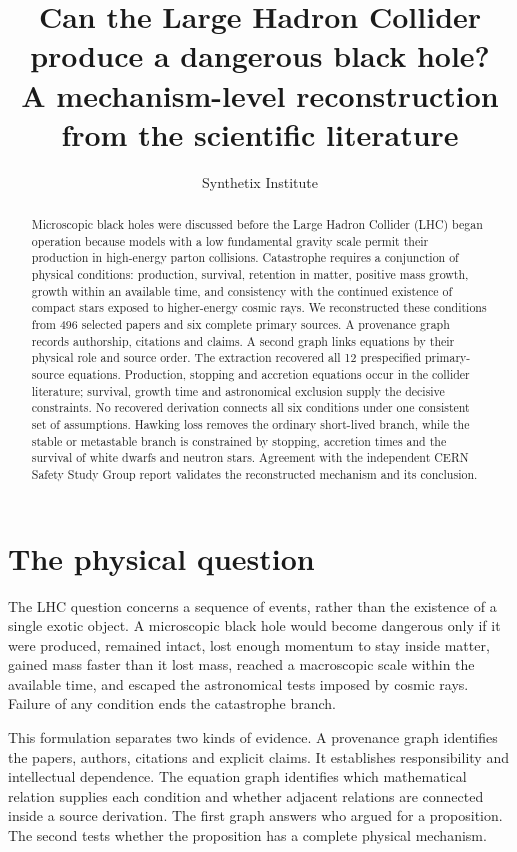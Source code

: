 \documentclass[10pt]{article}
\title{Can the Large Hadron Collider produce a dangerous black hole?\\
\large A mechanism-level reconstruction from the scientific literature}
\author{Synthetix Institute}
\date{}
\begin{document}
\maketitle

\begin{abstract}
Microscopic black holes were discussed before the Large Hadron Collider (LHC) began operation because models with a low fundamental gravity scale permit their production in high-energy parton collisions. Catastrophe requires a conjunction of physical conditions: production, survival, retention in matter, positive mass growth, growth within an available time, and consistency with the continued existence of compact stars exposed to higher-energy cosmic rays. We reconstructed these conditions from 496 selected papers and six complete primary sources. A provenance graph records authorship, citations and claims. A second graph links equations by their physical role and source order. The extraction recovered all 12 prespecified primary-source equations. Production, stopping and accretion equations occur in the collider literature; survival, growth time and astronomical exclusion supply the decisive constraints. No recovered derivation connects all six conditions under one consistent set of assumptions. Hawking loss removes the ordinary short-lived branch, while the stable or metastable branch is constrained by stopping, accretion times and the survival of white dwarfs and neutron stars. Agreement with the independent CERN Safety Study Group report validates the reconstructed mechanism and its conclusion.
\end{abstract}

\section{The physical question}

The LHC question concerns a sequence of events, rather than the existence of a single exotic object. A microscopic black hole would become dangerous only if it were produced, remained intact, lost enough momentum to stay inside matter, gained mass faster than it lost mass, reached a macroscopic scale within the available time, and escaped the astronomical tests imposed by cosmic rays. Failure of any condition ends the catastrophe branch.

This formulation separates two kinds of evidence. A provenance graph identifies the papers, authors, citations and explicit claims. It establishes responsibility and intellectual dependence. The equation graph identifies which mathematical relation supplies each condition and whether adjacent relations are connected inside a source derivation. The first graph answers who argued for a proposition. The second tests whether the proposition has a complete physical mechanism.
\end{document}

